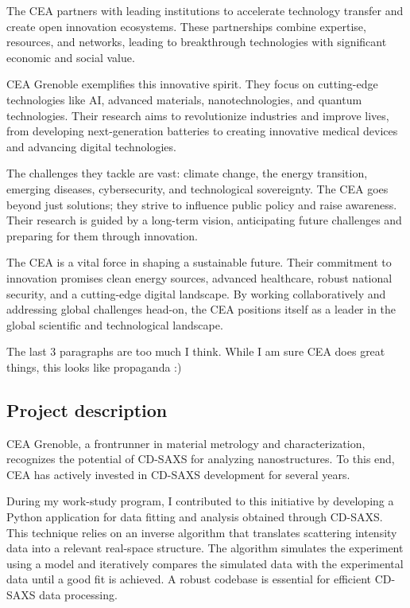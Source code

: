 \medskip

The CEA partners with leading institutions to accelerate technology transfer and create open innovation ecosystems. 
 These partnerships combine expertise, resources, and networks, leading to breakthrough technologies with significant 
 economic and social value.

\medskip

CEA Grenoble exemplifies this innovative spirit. They focus on cutting-edge technologies like AI, advanced materials,
 nanotechnologies, and quantum technologies. Their research aims to revolutionize industries and improve lives, from
 developing next-generation batteries to creating innovative medical devices and advancing digital technologies.

\medskip

The challenges they tackle are vast: climate change, the energy transition, emerging diseases, cybersecurity, and 
technological sovereignty. The CEA goes beyond just solutions; they strive to influence public policy and raise awareness. 
 Their research is guided by a long-term vision, anticipating future challenges and preparing for them through innovation.

\medskip

The CEA is a vital force in shaping a sustainable future. Their commitment to innovation promises clean energy sources, 
advanced healthcare, robust national security, and a cutting-edge digital landscape. By working collaboratively and addressing
 global challenges head-on, the CEA positions itself as a leader in the global scientific and technological landscape.

 \color{red} The last 3 paragraphs are too much I think. While I am sure CEA does great things, this looks like propaganda :) \color{black}
 
\medskip

\subsection{Project description}

\medskip
CEA Grenoble, a frontrunner in material metrology and characterization, recognizes the potential
 of CD-SAXS for analyzing nanostructures. To this end, CEA has actively invested in CD-SAXS development for several years.

\medskip

During my work-study program, I contributed to this initiative by developing a Python application
 for data fitting and analysis obtained through CD-SAXS. This technique relies on an inverse 
 algorithm that translates scattering intensity data into a relevant real-space structure. The 
 algorithm simulates the experiment using a model and iteratively compares the simulated data 
 with the experimental data until a good fit is achieved. A robust codebase is essential for 
 efficient CD-SAXS data processing.

